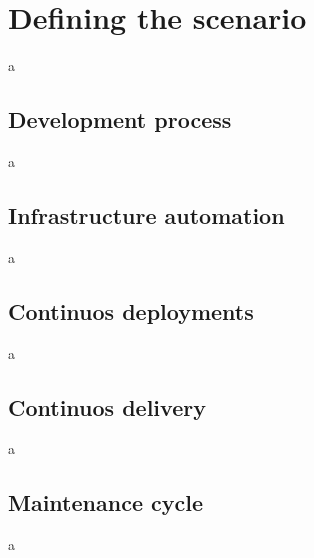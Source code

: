 \chapter{Defining the scenario}

a

\section{Development process}

a

\section{Infrastructure automation}

a

\section{Continuos deployments}

a

\section{Continuos delivery}

a

\section{Maintenance cycle}

a